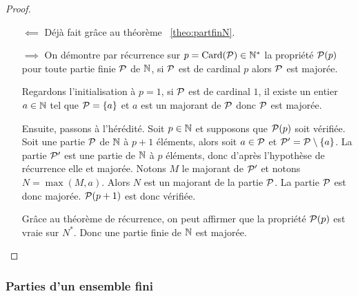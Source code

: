 \begin{proof}
  \begin{itemize}
  \item[\(\impliedby\)] Déjà fait grâce au théorème~
\ref{theo:partfinN}.
  \item[\(\implies\)] On démontre par récurrence sur \(p=\Card(\P)\in \N^*\) la propriété \(\P(p)\) pour toute partie finie \(\P\) de \(\N\), si \(\P\) est de cardinal \(p\) alors \(\P\) est majorée. 

Regardons l'initialisation à \(p=1\), si \(\P\) est de cardinal \(1\), il existe un entier \(a\in\N\) tel que \(\P=\{a\}\) et \(a\) est un majorant de \(\P\) donc \(\P\) est majorée.

Ensuite, passons à l'hérédité. Soit \(p \in \N\) et supposons que \(\P(p)\) soit vérifiée. Soit une partie \(\P\) de \(\N\) à \(p+1\) éléments, alors soit \(a\in \P\) et \(\P'=\P\setminus\{a\}\). La partie \(\P'\) est une partie de \(\N\) à \(p\) éléments, donc d'après l'hypothèse de récurrence elle et majorée. Notons \(M\) le majorant de \(\P'\) et notons \(N=\max(M,a)\). Alors \(N\) est un majorant de la partie \(\P\). La partie \(\P\) est donc majorée. \(\P(p+1)\) est donc vérifiée.

Grâce au théorème de récurrence, on peut affirmer que la propriété \(\P(p)\) est vraie sur \(N^*\). Donc une partie finie de \(\N\) est majorée.
  \end{itemize}
\end{proof}

\subsubsection{Parties d'un ensemble fini}

